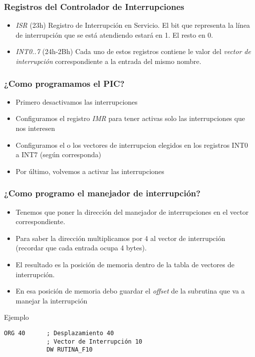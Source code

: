 \documentclass{beamer}
\begin{document}
\begin{frame}
\frametitle{Registros del Controlador de Interrupciones}


\begin{itemize}
 \item \emph{ISR} (23h) Registro de Interrupción en Servicio. El bit que representa la línea de interrupción que se está atendiendo estará en 1. El resto en 0.
 \item \emph{INT0..7} (24h-2Bh) Cada uno de estos registros contiene le valor del \emph{vector de interrupción} correspondiente a la entrada del mismo nombre.
\end{itemize}

\end{frame}

\begin{frame}
\frametitle{¿Como programamos el PIC?}


\begin{itemize}
 \item Primero desactivamos las interrupciones
 \item Configuramos el registro \emph{IMR} para tener activas solo las interrupciones que nos interesen
 \item Configuramos el o los vectores de interrupcion elegidos en los registros INT0 a INT7 (según corresponda)
 \item Por último, volvemos a activar las interrupciones
\end{itemize}

\end{frame}

\begin{frame}[fragile]
\frametitle{¿Como programo el manejador de interrupción?}

\begin{itemize}
 \item Tenemos que poner la dirección del manejador de interrupciones en el vector correspondiente.
 \item Para saber la dirección multiplicamos por 4 al vector de interrupción (recordar que cada entrada ocupa 4 bytes).
 \item El resultado es la posición de memoria dentro de la tabla de vectores de interrupción.
 \item En esa posición de memoria debo guardar el \emph{offset} de la subrutina que va a manejar la interrupción
\end{itemize}
\begin{block}{Ejemplo}
\begin{verbatim}
ORG 40      ; Desplazamiento 40 
            ; Vector de Interrupción 10
			DW RUTINA_F10
\end{verbatim}
\end{block}

\end{frame}
\end{document}
